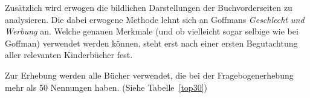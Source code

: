 

    Zusätzlich wird erwogen die bildlichen Darstellungen der Buchvorderseiten zu
    analysieren. Die dabei erwogene Methode lehnt sich an Goffmans
    \emph{Geschlecht und Werbung} an. Welche genauen Merkmale (und ob vielleicht
    sogar selbige wie bei Goffman) verwendet werden können, steht erst nach
    einer ersten Begutachtung aller relevanten Kinderbücher fest.

    Zur Erhebung werden alle Bücher verwendet, die bei der Fragebogenerhebung
    mehr als 50 Nennungen haben. (Siehe Tabelle~\ref{top30})

      
